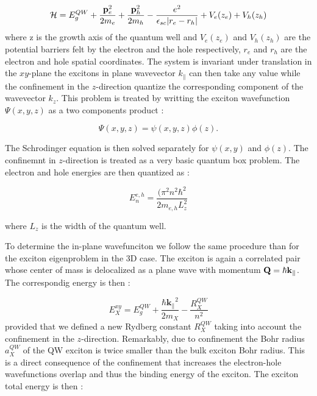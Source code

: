 \begin{equation}
    \mathcal{H} = E_g^{QW} + \dfrac{\mathbf{p}^2_e}{2m_e} + \dfrac{\mathbf{p}^2_h}{2m_h} - \dfrac{e^2}{\epsilon_{sc}|r_e-r_h|}+V_e(z_e)+V_h(z_h)
\end{equation}
where z is the growth axis of the quantum well and $V_e(z_e)$ and $V_h(z_h)$ are the potential barriers felt by the electron and the hole respectively, $r_e$ and $r_h$  are the electron and hole spatial coordinates. 
The system is invariant under translation in the $xy$-plane the excitons in plane wavevector $k_{\parallel}$ can then take any value while the confinement in the $z$-direction quantize the corresponding component of the wavevector $k_z$. 
This problem is treated by writting the exciton wavefunction $\Psi(x,y,z)$ as a two components product :

\begin{equation}
    \Psi(x,y,z) = \psi(x,y,z)\phi(z).
    \label{eq:2D_exciton_wavefunction}
\end{equation}

The Schrodinger equation is then solved separately for $\psi(x,y)$ and $\phi(z)$. 
The confinemnt in $z$-direction is treated as a very basic quantum box problem. The electron and hole energies are then quantized as :

\begin{equation}
    E_n^{e,h} = \dfrac{(\pi^2 n^2\hbar^2}{2m_{e,h}L_z^2}
    \label{eq:QW_energy_levels}
\end{equation}

where $L_z$ is the width of the quantum well.

To determine the in-plane wavefunciton we follow the same procedure than for the exciton eigenproblem in the 3D case.
The exciton is again a correlated pair whose center of mass is delocalized as a plane wave with momentum $\mathbf{Q} = \hbar \mathbf{k}_\parallel$. The correspondig energy is then  :

\begin{equation}
    E_X^{xy} = E_g^{QW} + \dfrac{\mathbf{\hbar k_{\parallel}}^2}{2m_X} - \dfrac{R_X^{QW}}{n^2}
\end{equation}
provided that we defined a new Rydberg constant $R_X^{QW}$ taking into account the confinement in the $z$-direction. Remarkably, due to confinement the Bohr radius $a_X^{QW}$
of the QW exciton is twice smaller than the bulk exciton Bohr radius. This is a direct consequence of the confinement that increases the electron-hole wavefunctions overlap and thus the binding energy of the exciton. The exciton total energy is then : 

